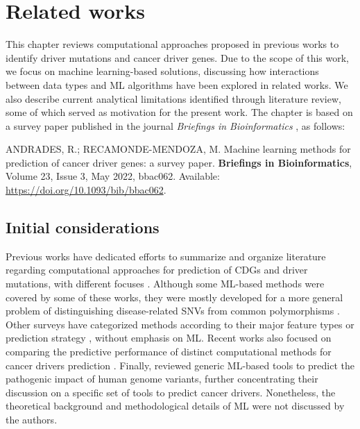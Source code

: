
\chapter{Related works}
\label{sec:related_works}

This chapter reviews computational approaches proposed in previous works to identify driver mutations and cancer driver genes.   
Due to the scope of this work, we focus on machine learning-based solutions, discussing how interactions between data types and ML algorithms have been explored in related works. We also describe current analytical limitations identified through literature review, some of which served as motivation for the present work. The chapter is based on a survey paper published in the journal \textit{Briefings in Bioinformatics} \cite{andrades2022machine}, as follows:

\vspace{0.7cm}
\hfill\begin{minipage}{0.92\textwidth}
ANDRADES, R.; RECAMONDE-MENDOZA, M. Machine learning methods for prediction of cancer driver genes: a survey paper. \textbf{Briefings in Bioinformatics}, Volume 23, Issue 3, May 2022, bbac062. Available: \url{https://doi.org/10.1093/bib/bbac062}.
\end{minipage}


\section{Initial considerations}

Previous works have dedicated efforts to summarize and organize literature regarding computational approaches for prediction of CDGs and driver mutations, with different focuses \cite{zhang2014identifying, chen2015deciphering, cheng2016advances, dimitrakopoulos2017computational, chen2020comprehensive, Rogers+2021}.
Although some ML-based methods were covered by some of these works, they were mostly developed for a more general problem of distinguishing disease-related SNVs from common polymorphisms \cite{zhang2014identifying, chen2015deciphering}. Other surveys have categorized methods according to their major feature types \cite{cheng2016advances} or prediction strategy \cite{dimitrakopoulos2017computational}, without emphasis on ML. Recent works also focused on comparing the predictive performance of distinct computational methods for cancer drivers prediction \cite{chen2020comprehensive, pham2021computational}. Finally, \citet{Rogers+2021} reviewed generic ML-based tools to predict the pathogenic impact of human genome variants, further concentrating their discussion on a specific set of tools to predict cancer drivers.
Nonetheless, the theoretical background and methodological details of ML were not discussed by the authors.

